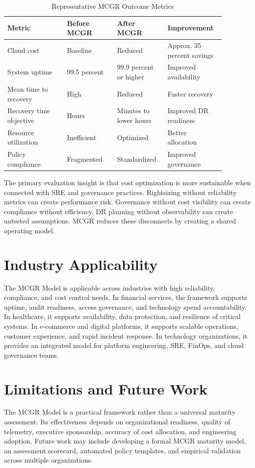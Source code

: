 \documentclass[conference]{IEEEtran}
\begin{document}
\begin{table}[!t]
\centering
\caption{Representative MCGR Outcome Metrics}
\label{tab:results}
\begin{tabular}{p{0.25\linewidth}p{0.21\linewidth}p{0.21\linewidth}p{0.21\linewidth}}
\toprule
\textbf{Metric} & \textbf{Before MCGR} & \textbf{After MCGR} & \textbf{Improvement} \\
\midrule
Cloud cost & Baseline & Reduced & Approx. 35 percent savings \\
System uptime & 99.5 percent & 99.9 percent or higher & Improved availability \\
Mean time to recovery & High & Reduced & Faster recovery \\
Recovery time objective & Hours & Minutes to lower hours & Improved DR readiness \\
Resource utilization & Inefficient & Optimized & Better allocation \\
Policy compliance & Fragmented & Standardized & Improved governance \\
\bottomrule
\end{tabular}
\end{table}

The primary evaluation insight is that cost optimization is more sustainable when connected with SRE and governance practices. Rightsizing without reliability metrics can create performance risk. Governance without cost visibility can create compliance without efficiency. DR planning without observability can create untested assumptions. MCGR reduces these disconnects by creating a shared operating model.

\section{Industry Applicability}
The MCGR Model is applicable across industries with high reliability, compliance, and cost control needs. In financial services, the framework supports uptime, audit readiness, access governance, and technology spend accountability. In healthcare, it supports availability, data protection, and resilience of critical systems. In e-commerce and digital platforms, it supports scalable operations, customer experience, and rapid incident response. In technology organizations, it provides an integrated model for platform engineering, SRE, FinOps, and cloud governance teams.

\section{Limitations and Future Work}
The MCGR Model is a practical framework rather than a universal maturity assessment. Its effectiveness depends on organizational readiness, quality of telemetry, executive sponsorship, accuracy of cost allocation, and engineering adoption. Future work may include developing a formal MCGR maturity model, an assessment scorecard, automated policy templates, and empirical validation across multiple organizations.
\end{document}
